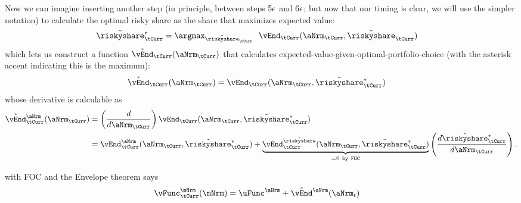\documentclass[./SolvingMicroDSOPs]{subfiles}
\begin{document}
Now we can imagine inserting another step (in principle, between steps $5\epsilon$ and $6\epsilon$; but now that our timing is clear, we will use the simpler notation) to calculate the optimal risky share as the share that maximizes expected value:
\begin{align}
  \Rend{\riskyshare}_{\tCurr}^{*} & = \argmax_{\Rend{\riskyshare}_{\tCurr}} ~~\vEnd_{\tCurr}(\aNrm_{\tCurr},\Rend{\riskyshare}_{\tCurr})
\end{align}
which lets us construct a function $\Maxed{\vEnd}_{\tCurr}(\aNrm_{\tCurr})$ that calculates expected-value-given-optimal-portfolio-choice (with the asterisk accent indicating this is the maximum):
\begin{align}
  \Maxed{\vEnd}_{\tCurr}(\aNrm_{\tCurr}) & = \vEnd_{\tCurr}(\aNrm_{\tCurr},\Rend{\riskyshare}_{\tCurr}^{*})       
\end{align}
whose derivative is calculable as
\begin{align}
  \Maxed{\vEnd}_{\tCurr}^{\aNrm}(\aNrm_{\tCurr}) & = \left(\frac{d}{d \aNrm_{\tCurr}}\right) \vEnd_{\tCurr}(\aNrm_{\tCurr},\Rend{\riskyshare}_{\tCurr}^{*}) 
  \\ & = \vEnd_{\tCurr}^{\aNrm}(\aNrm_{\tCurr},\Rend{\riskyshare}_{\tCurr}^{*})+\underbrace{
       \vEnd_{\tCurr}^{\Rend{\riskyshare}}(\aNrm_{\tCurr},\Rend{\riskyshare}_{\tCurr}^{*})}_{=0~\texttt{by FOC}}\left(\frac{d \Rend{\riskyshare}_{\tCurr}^{*}}{d \aNrm_{\tCurr}}\right) \notag.
\end{align}

with FOC
and the Envelope theorem says
\begin{align}
  \vFunc^{\mNrm}_{\tCurr}(\mNrm) & = \uFunc^{\aNrm}+\Maxed{\vEnd}^{\aNrm}(\aNrm_{t})
\end{align}
\end{document}
